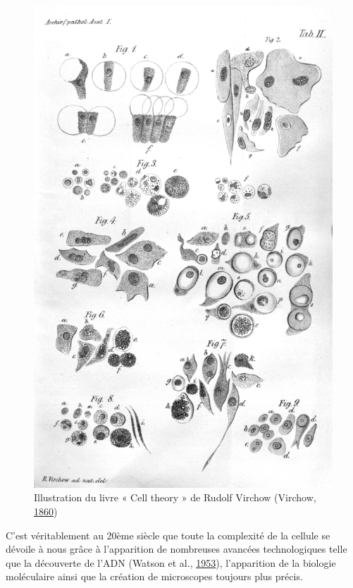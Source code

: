 \documentclass[12pt,a4paper,twoside,openright]{book}
\begin{document}
\begin{figure}[htbp]
\centering
\includegraphics{figures/intro/virchow.png}
\caption[Illustration du livre « Cell theory » de Rudolf Virchow]{\label{fig:virchow}Illustration
du livre « Cell theory » de Rudolf Virchow (Virchow,
\hyperref[ref-virchow1860cellular]{1860})}
\end{figure}

C'est véritablement au 20ème siècle que toute la complexité de la
cellule se dévoile à nous grâce à l'apparition de nombreuses avancées
technologiques telle que la découverte de l'ADN (Watson et al.,
\hyperref[ref-watson1953molecular]{1953}), l'apparition de la biologie
moléculaire ainsi que la création de microscopes toujours plus précis.
\end{document}

